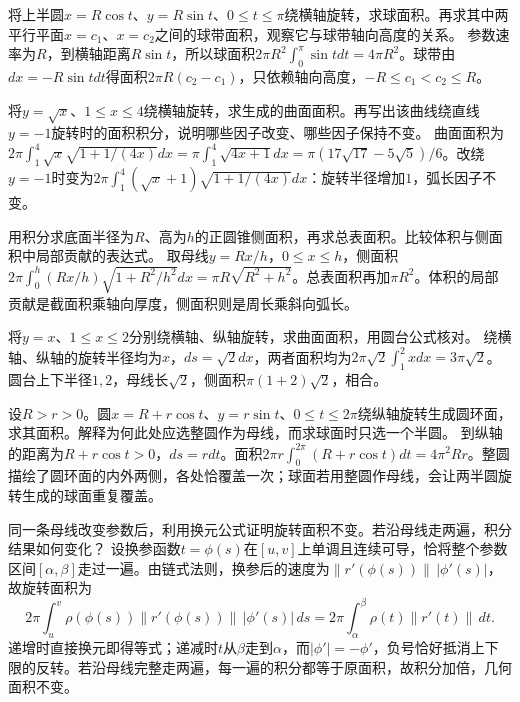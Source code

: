 将上半圆\(x=R\cos t\)、\(y=R\sin t\)、\(0\le t\le\pi\)绕横轴旋转，求球面积。再求其中两平行平面\(x=c_1\)、\(x=c_2\)之间的球带面积，观察它与球带轴向高度的关系。
\solutionanswer
参数速率为\(R\)，到横轴距离\(R\sin t\)，所以球面积\(2\pi R^2\int_0^\pi\sin tdt=4\pi R^2\)。球带由\(dx=-R\sin tdt\)得面积\(2\pi R(c_2-c_1)\)，只依赖轴向高度，\(-R\le c_1<c_2\le R\)。


将\(y=\sqrt{x}\)、\(1\le x\le4\)绕横轴旋转，求生成的曲面面积。再写出该曲线绕直线\(y=-1\)旋转时的面积积分，说明哪些因子改变、哪些因子保持不变。
\solutionanswer
曲面面积为\(2\pi\int_1^4\sqrt x\sqrt{1+1/(4x)}dx=\pi\int_1^4\sqrt{4x+1}dx=\pi(17\sqrt{17}-5\sqrt5)/6\)。改绕\(y=-1\)时变为\(2\pi\int_1^4(\sqrt x+1)\sqrt{1+1/(4x)}dx\)：旋转半径增加\(1\)，弧长因子不变。


用积分求底面半径为\(R\)、高为\(h\)的正圆锥侧面积，再求总表面积。比较体积与侧面积中局部贡献的表达式。
\solutionanswer
取母线\(y=Rx/h\)，\(0\le x\le h\)，侧面积\(2\pi\int_0^h(Rx/h)\sqrt{1+R^2/h^2}dx=\pi R\sqrt{R^2+h^2}\)。总表面积再加\(\pi R^2\)。体积的局部贡献是截面积乘轴向厚度，侧面积则是周长乘斜向弧长。


将\(y=x\)、\(1\le x\le2\)分别绕横轴、纵轴旋转，求曲面面积，用圆台公式核对。
\solutionanswer
绕横轴、纵轴的旋转半径均为\(x\)，\(ds=\sqrt2dx\)，两者面积均为\(2\pi\sqrt2\int_1^2x dx=3\pi\sqrt2\)。圆台上下半径\(1,2\)，母线长\(\sqrt2\)，侧面积\(\pi(1+2)\sqrt2\)，相合。


设\(R>r>0\)。圆\(x=R+r\cos t\)、\(y=r\sin t\)、\(0\le t\le2\pi\)绕纵轴旋转生成圆环面，求其面积。解释为何此处应选整圆作为母线，而求球面时只选一个半圆。
\solutionanswer
到纵轴的距离为\(R+r\cos t>0\)，\(ds=r dt\)。面积\(2\pi r\int_0^{2\pi}(R+r\cos t)dt=4\pi^2Rr\)。整圆描绘了圆环面的内外两侧，各处恰覆盖一次；球面若用整圆作母线，会让两半圆旋转生成的球面重复覆盖。


同一条母线改变参数后，利用换元公式证明旋转面积不变。若沿母线走两遍，积分结果如何变化？
\solutionanswer
设换参函数\(t=\phi(s)\)在\([u,v]\)上单调且连续可导，恰将整个参数区间\([\alpha,\beta]\)走过一遍。由链式法则，换参后的速度为\(\|r'(\phi(s))\|\,|\phi'(s)|\)，故旋转面积为
\[
 2\pi\int_u^v \rho(\phi(s))\|r'(\phi(s))\|\,|\phi'(s)|\,ds
 =2\pi\int_\alpha^\beta \rho(t)\|r'(t)\|\,dt.
\]
递增时直接换元即得等式；递减时\(t\)从\(\beta\)走到\(\alpha\)，而\(|\phi'|=-\phi'\)，负号恰好抵消上下限的反转。若沿母线完整走两遍，每一遍的积分都等于原面积，故积分加倍，几何面积不变。
\par
